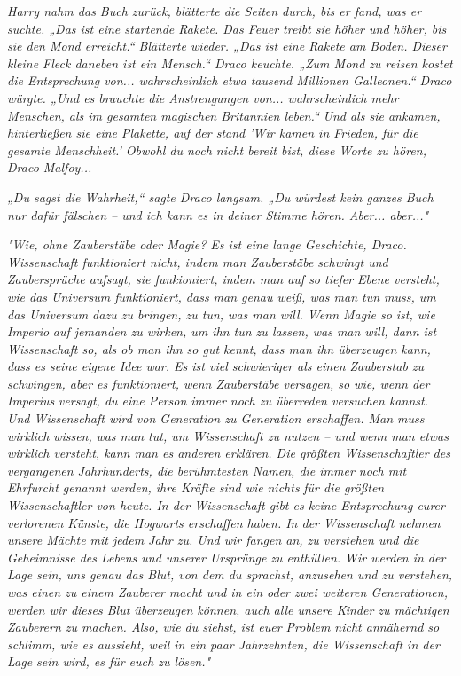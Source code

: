 {\emph{Harry nahm das Buch zurück, blätterte die Seiten durch, bis er fand, was er suchte. „Das ist eine startende Rakete. Das Feuer treibt sie höher und höher, bis sie den Mond erreicht.“ Blätterte wieder. „Das ist eine Rakete am Boden. Dieser kleine Fleck daneben ist ein Mensch.“ Draco keuchte. „Zum Mond zu reisen kostet die Entsprechung von... wahrscheinlich etwa} \emph{tausend Millionen Galleonen.“ Draco würgte. „Und es brauchte die Anstrengungen von... wahrscheinlich mehr Menschen, als im gesamten magischen Britannien leben.“} \emph{\emph{Und als sie ankamen, hinterließen sie eine Plakette, auf der stand 'Wir kamen in Frieden, für die gesamte Menschheit.' Obwohl du noch nicht bereit bist, diese Worte zu hören, Draco Malfoy...}}

\emph{„Du sagst die Wahrheit,“ sagte Draco langsam. „Du würdest kein ganzes Buch nur dafür fälschen -- und ich kann es in deiner Stimme hören. Aber... aber..."}

\emph{"Wie, ohne Zauberstäbe oder Magie? Es ist eine lange Geschichte, Draco. Wissenschaft funktioniert nicht, indem man Zauberstäbe schwingt und Zaubersprüche aufsagt, sie funkioniert, indem man auf so tiefer Ebene versteht, wie das Universum funktioniert, dass man genau weiß, was man tun muss, um das Universum dazu zu bringen, zu tun, was man will. Wenn Magie so ist, wie} \emph{\emph{Imperio}} \emph{auf jemanden zu wirken, um ihn tun zu lassen, was man will, dann ist Wissenschaft so, als ob man ihn so gut kennt, dass man ihn überzeugen kann, dass es seine eigene Idee war. Es ist viel schwieriger als einen Zauberstab zu schwingen, aber es funktioniert, wenn Zauberstäbe versagen, so wie, wenn der} \emph{\emph{Imperius}} \emph{versagt, du eine Person immer noch zu überreden versuchen kannst. Und Wissenschaft wird von Generation zu Generation erschaffen. Man muss wirklich} \emph{\emph{wissen,}} \emph{was man tut, um Wissenschaft zu nutzen -- und wenn man etwas wirklich versteht, kann man es anderen erklären. Die größten Wissenschaftler des vergangenen Jahrhunderts, die berühmtesten Namen, die immer noch mit Ehrfurcht genannt werden, ihre Kräfte sind wie} \emph{\emph{nichts}} \emph{für die größten Wissenschaftler von heute. In der Wissenschaft gibt es keine Entsprechung eurer verlorenen Künste, die Hogwarts erschaffen haben. In der Wissenschaft nehmen unsere Mächte mit jedem Jahr zu. Und wir fangen an, zu verstehen und die Geheimnisse des Lebens und unserer Ursprünge zu enthüllen. Wir werden in der Lage sein, uns genau das Blut, von dem du sprachst, anzusehen und zu verstehen, was einen zu einem Zauberer macht und in ein oder zwei weiteren Generationen, werden wir dieses Blut überzeugen können, auch alle unsere Kinder zu mächtigen Zauberern zu machen. Also, wie du siehst, ist euer Problem nicht annähernd so schlimm, wie es aussieht, weil in ein paar Jahrzehnten, die Wissenschaft in der Lage sein wird, es für euch zu lösen."}

}

